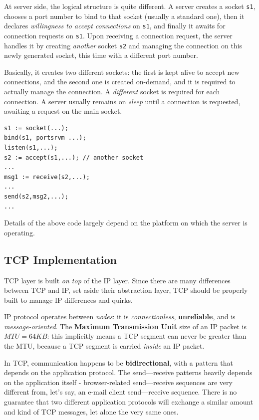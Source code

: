 \documentclass[10pt]{extbook}
\begin{document}
At server side, the logical structure is quite different. A server creates
a socket \texttt{s1}, chooses a port number to bind to that socket (usually a
standard one), then it declares \emph{willingness to accept connections} on
\texttt{s1}, and finally it awaits for connection requests on \texttt{s1}. Upon
receiving a connection request, the server handles it by creating
\emph{another} socket \texttt{s2} and managing the connection on this newly
generated socket, this time with a different port number. 

Basically, it creates two different sockets: the first is kept alive to accept
new connections, and the second one is created on-demand, and it is required to
actually manage the connection. A \emph{different} socket is required for each
connection. A server usually remains on \emph{sleep} until a connection is
requested, awaiting a request on the main socket.

\begin{verbatim} 
s1 := socket(...);
bind(s1, portsrvm ...);
listen(s1,...);
s2 := accept(s1,...); // another socket
... 
msg1 := receive(s2,...);
...
send(s2,msg2,...);
... 
\end{verbatim}

Details of the above code largely depend on the platform on which the server is
operating.

\subsection{TCP Implementation}

TCP layer is built \emph{on top} of the IP layer. Since there are many differences
between TCP and IP, set aside their abstraction layer, TCP should be properly
built to manage IP differences and quirks. 

IP protocol operates between \emph{nodes}: it is \emph{connectionless},
\textbf{unreliable}, and is \emph{message-oriented}. The \textbf{Maximum
Transmission Unit} size of an IP packet is $MTU = 64KB$: this implicitly means
a TCP segment can never be greater than the MTU, because a TCP segment is
carried \emph{inside} an IP packet.

In TCP, communication happens to be \textbf{bidirectional}, with a pattern that
depends on the application protocol. The send\----receive patterns heavily depends
on the application itself \-- browser-related send\----receive sequences are
very different from, let's say, an e-mail client send\----receive sequence.
There is no guarantee that two different application protocols will exchange a
similar amount and kind of TCP messages, let alone the very same ones.
\end{document}
